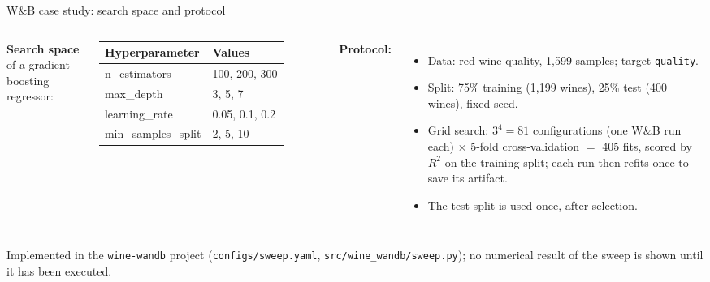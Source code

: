 \begin{frame}{W\&B case study: search space and protocol}
\begin{columns}[T]
\begingroup\footnotesize
\textbf{Search space} of a gradient boosting regressor:
\vspace{0.3em}

\begin{tabular}{>{\ttfamily}l l}
\normalfont\bfseries Hyperparameter & \bfseries Values \\
\toprule
n\_estimators & 100, 200, 300 \\
max\_depth & 3, 5, 7 \\
learning\_rate & 0.05, 0.1, 0.2 \\
min\_samples\_split & 2, 5, 10 \\
\bottomrule
\end{tabular}
\par\endgroup
{}
\begingroup\footnotesize
\textbf{Protocol:}
\begin{itemize}
\item Data: red wine quality, 1{,}599 samples; target \texttt{quality}.
\item Split: 75\% training (1{,}199 wines), 25\% test (400 wines), fixed seed.
\item Grid search: $3^4 = 81$ configurations (one W\&B run each) $\times$ 5-fold cross-validation $=$ 405 fits, scored by $R^2$ on the training split; each run then refits once to save its artifact.
\item The test split is used once, after selection.
\end{itemize}
\par\endgroup
\end{columns}
\vspace{0.6em}
{\scriptsize Implemented in the \texttt{wine-wandb} project (\texttt{configs/sweep.yaml}, \texttt{src/wine\_wandb/sweep.py}); no numerical result of the sweep is shown until it has been executed.\par}
\coursefooter
\end{frame}

